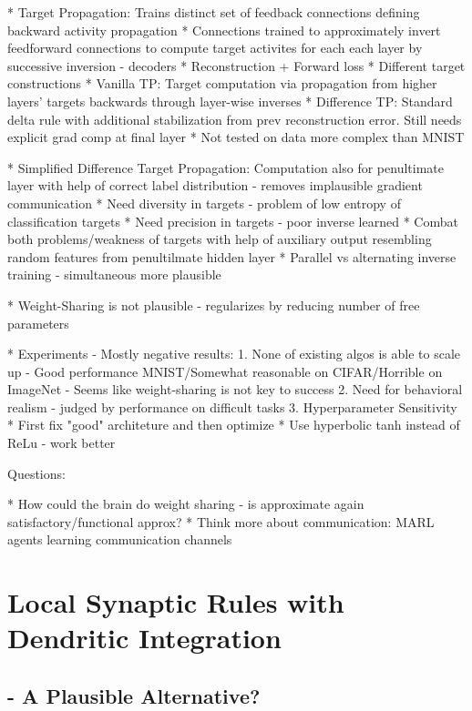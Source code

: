 \documentclass{article}
\theoremstyle{definition}
\begin{document}
* Target Propagation: Trains distinct set of feedback connections defining backward activity propagation
    * Connections trained to approximately invert feedforward connections to compute target activites for each each layer by successive inversion - decoders
        * Reconstruction + Forward loss
        * Different target constructions
    * Vanilla TP: Target computation via propagation from higher layers' targets backwards through layer-wise inverses
    * Difference TP: Standard delta rule with additional stabilization from prev reconstruction error. Still needs explicit grad comp at final layer
    * Not tested on data more complex than MNIST

* Simplified Difference Target Propagation: Computation also for penultimate layer with help of correct label distribution - removes implausible gradient communication
    * Need diversity in targets - problem of low entropy of classification targets
    * Need precision in targets - poor inverse learned
    * Combat both problems/weakness of targets with help of auxiliary output resembling random features from penultilmate hidden layer
    * Parallel vs alternating inverse training - simultaneous more plausible

* Weight-Sharing is not plausible - regularizes by reducing number of free parameters

* Experiments - Mostly negative results:
    1. None of existing algos is able to scale up - Good performance MNIST/Somewhat reasonable on CIFAR/Horrible on ImageNet - Seems like weight-sharing is not key to success
    2. Need for behavioral realism - judged by performance on difficult tasks
    3. Hyperparameter Sensitivity
        * First fix "good" architeture and then optimize
        * Use hyperbolic tanh instead of ReLu - work better


Questions:

* How could the brain do weight sharing - is approximate again satisfactory/functional approx?
* Think more about communication: MARL agents learning communication channels

\newpage
\section*{Local Synaptic Rules with Dendritic Integration}

\subsection*{\citet{guerguiev2017} - A Plausible Alternative?}
\end{document}
